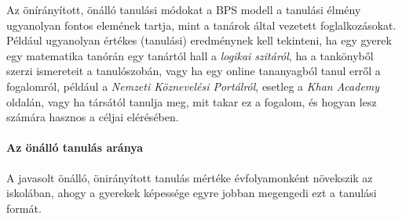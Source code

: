 Az önírányított, önálló tanulási módokat a BPS modell a tanulási élmény
ugyanolyan fontos elemének tartja, mint a tanárok által vezetett
foglalkozásokat. Például ugyanolyan értékes (tanulási) eredménynek kell
tekinteni, ha egy gyerek egy matematika tanórán egy tanártól hall a
\emph{logikai szitáról}, ha a tankönyből szerzi ismereteit a
tanulószobán, vagy ha egy online tananyagból tanul erről a fogalomról,
például a
{\emph{Nemzeti
Köznevelési Portálról}}, esetleg a
{\emph{Khan
Academy}} oldalán, vagy ha társától tanulja meg, mit takar ez a fogalom,
és hogyan lesz számára hasznos a céljai elérésében.

\hypertarget{az-onallo-tanulas-aranya}{%
\paragraph{Az önálló tanulás aránya}\label{az-onallo-tanulas-aranya}}

A javasolt önálló, önirányított tanulás mértéke évfolyamonként növekszik
az iskolában, ahogy a gyerekek képessége egyre jobban megengedi ezt a
tanulási formát.

